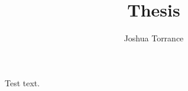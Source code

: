 \documentclass[11pt]{report}
\begin{document}
\title{Thesis}

\author{Joshua Torrance}

\maketitle

Test text.
\end{document}
